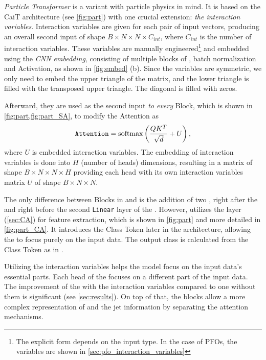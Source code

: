 \emph{Particle Transformer} \cite{part} is a \trans variant with particle physics in mind.
It is based on the CaiT \cite{cait} architecture (see \cref{fig:part}) with one crucial extension: \emph{the interaction variables}.
Interaction variables are given for each pair of input vectors, producing an overall second input of shape $B \times N \times N \times C_{int}$, where $C_{int}$ is the number of interaction variables.
These variables are manually engineered\footnote{The explicit form depends on the input type. In the case of PFOs, the variables are shown in \cref{sec:pfo_interaction_variables}} and embedded using the \emph{CNN embedding}, consisting of multiple blocks of \pointCNN, batch normalization and Activation, as shown in \cref{fig:embed} (b).
Since the variables are symmetric, we only need to embed the upper triangle of the matrix, and the lower triangle is filled with the transposed upper triangle.
The diagonal is filled with zeros.

Afterward, they are used as the second input \emph{to every} \SA Block, which is shown in \cref{fig:part,fig:part_SA}, to modify the Attention as
\begin{equation}
    \label{eq:attn_mod}
    \text{\texttt{Attention}} = \text{softmax}\left(\frac{QK^T}{\sqrt{d}} + U\right),
\end{equation}
where $U$ is embedded interaction variables.
The \pointCNN embedding of interaction variables is done into $H$ (number of heads) dimensions, resulting in a matrix of shape $B \times N \times N \times H$ providing each head with its own interaction variables matrix $U$ of shape $B \times N \times N$.

The only difference between \SA Blocks in \trans and \ParT is the addition of two \LN, right after the \MHSA and right before the second \texttt{Linear} layer of the \FFN.
However, \ParT utilizes the \CA layer (\cref{sec:CA}) for feature extraction, which is shown in \cref{fig:part} and more detailed in \cref{fig:part_CA}.
It introduces the Class Token later in the architecture, allowing the \MHSA to focus purely on the input data.
The output class is calculated from the Class Token as in \trans.

Utilizing the interaction variables helps the model focus on the input data's essential parts.
Each head of the \MHSA focuses on a different part of the input data.
The improvement of the \ParT with the interaction variables compared to one without them is significant \cite{part} (see \cref{sec:results}).
On top of that, the \CA blocks allow a more complex representation of \PFOs and the jet information by separating the attention mechanisms.

